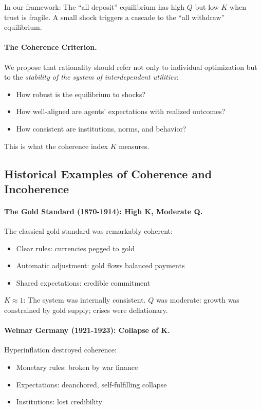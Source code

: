 \documentclass[12pt,a4paper]{article}
\begin{document}
In our framework: The ``all deposit'' equilibrium has high $Q$ but low $K$
when trust is fragile. A small shock triggers a cascade to the ``all withdraw'' equilibrium.

\paragraph{The Coherence Criterion.}
We propose that rationality should refer not only to individual optimization
but to the \emph{stability of the system of interdependent utilities}:
\begin{itemize}
  \item How robust is the equilibrium to shocks?
  \item How well-aligned are agents' expectations with realized outcomes?
  \item How consistent are institutions, norms, and behavior?
\end{itemize}

This is what the coherence index $K$ measures.

\subsection{Historical Examples of Coherence and Incoherence}

\paragraph{The Gold Standard (1870-1914): High K, Moderate Q.}
The classical gold standard was remarkably coherent:
\begin{itemize}
  \item Clear rules: currencies pegged to gold
  \item Automatic adjustment: gold flows balanced payments
  \item Shared expectations: credible commitment
\end{itemize}

$K \approx 1$: The system was internally consistent.
$Q$ was moderate: growth was constrained by gold supply; crises were deflationary.

\paragraph{Weimar Germany (1921-1923): Collapse of K.}
Hyperinflation destroyed coherence:
\begin{itemize}
  \item Monetary rules: broken by war finance
  \item Expectations: deanchored, self-fulfilling collapse
  \item Institutions: lost credibility
\end{itemize}
\end{document}
